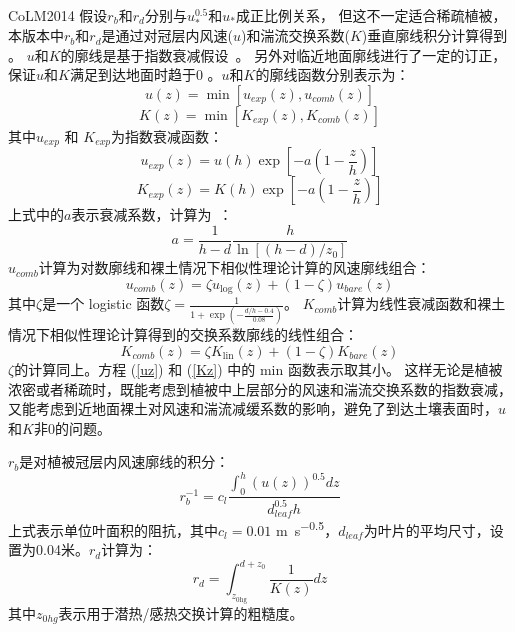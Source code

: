 CoLM2014 假设$r_b$和$r_d$分别与$u_\ast^{0.5}$和$u_\ast$成正比例关系，
但这不一定适合稀疏植被，本版本中$r_b$和$r_d$是通过对冠层内风速($u$)和湍流交换系数($K$)垂直廓线积分计算得到 \citep{dai2019different}。
$u$和$K$的廓线是基于指数衰减假设~\citep{inoue1963turbulent,cowan1968mass}。
另外对临近地面廓线进行了一定的订正，保证$u$和$K$满足到达地面时趋于0 \citep{dai2019different}。$u$和$K$的廓线函数分别表示为：
\begin{equation}\label{uz}
u(z)=\min \left[u_{exp}(z), u_{comb}(z)\right]
\end{equation}
\begin{equation}\label{Kz}
K(z)=\min \left[K_{exp}(z), K_{comb}(z)\right]
\end{equation}
其中$u_{exp}$ 和 $K_{exp}$为指数衰减函数：
\begin{equation}
u_{exp}(z)=u(h) \exp \left[-a\left(1-\frac{z}{h}\right)\right]
\end{equation}
\begin{equation}
K_{exp}(z)=K(h) \exp \left[-a\left(1-\frac{z}{h}\right)\right]
\end{equation}
上式中的$a$表示衰减系数，计算为~\citep{inoue1963turbulent,cowan1968mass,kondo1971relationship}：
\begin{equation}
a=\frac{1}{h-d} \frac{h}{\ln \left[(h-d) / z_{0}\right]}
\end{equation}
$u_{comb}$计算为对数廓线和裸土情况下相似性理论计算的风速廓线组合：
\begin{equation}\label{ucomb}
u_{comb}(z)=\zeta u_{\log }(z)+(1-\zeta) u_{{bare }}(z)
\end{equation}
其中$\zeta$是一个 logistic 函数$\zeta=\frac{1}{1+\exp{\left(-\frac{d/h-0.4}{0.08}\right)}}$。
$K_{comb}$计算为线性衰减函数和裸土情况下相似性理论计算得到的交换系数廓线的线性组合：
\begin{equation}\label{kcomb}
K_{comb}(z)=\zeta K_{\mathrm{lin}}(z)+(1-\zeta) K_{bare}(z)
\end{equation}
$\zeta$的计算同上。方程 (\ref{uz}) 和 (\ref{Kz}) 中的 min 函数表示取其小。
这样无论是植被浓密或者稀疏时，既能考虑到植被中上层部分的风速和湍流交换系数的指数衰减，
又能考虑到近地面裸土对风速和湍流减缓系数的影响，避免了到达土壤表面时，$u$和$K$非0的问题。


$r_b$是对植被冠层内风速廓线的积分：
\begin{equation}
r_{b}^{-1}=c_{l} \frac{\int_{0}^{h}(u(z))^{0.5} d z}{d_{leaf}^{0.5} h}
\end{equation}
上式表示单位叶面积的阻抗，其中$c_l=0.01$ \unit{m.s^{-0.5}}，$d_{leaf}$为叶片的平均尺寸，设置为0.04米。$r_d$计算为：
\begin{equation}\label{r_d1}
r_{d}=\int_{z_{0 \mathrm{hg}}}^{d+z_{0}} \frac{1}{K(z)} d z
\end{equation}
其中$z_{0hg}$表示用于潜热/感热交换计算的粗糙度\citep{zeng1998effect}。

